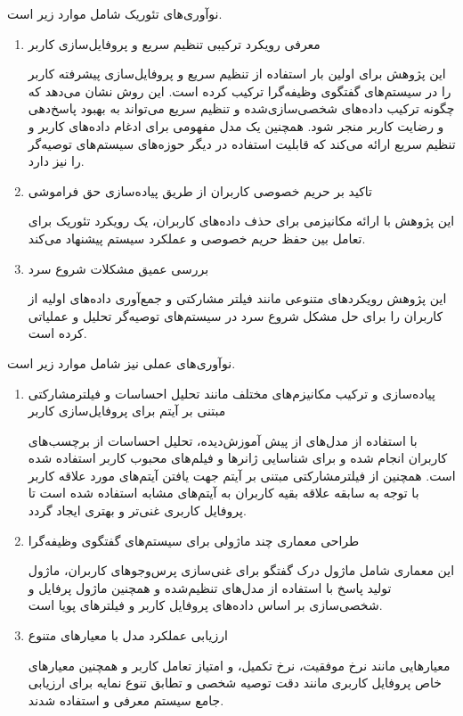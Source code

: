 نوآوری‌های تئوریک شامل موارد زیر است.
\begin{enumerate}
\item
معرفی رویکرد ترکیبی تنظیم سریع و پروفایل‌سازی کاربر

این پژوهش برای اولین بار استفاده از تنظیم سریع و پروفایل‌سازی پیشرفته کاربر را در سیستم‌های گفتگوی وظیفه‌گرا ترکیب کرده است. این روش نشان می‌دهد که چگونه ترکیب داده‌های شخصی‌سازی‌شده و تنظیم سریع می‌تواند به بهبود پاسخ‌دهی و رضایت کاربر منجر شود. همچنین یک مدل مفهومی برای ادغام داده‌های کاربر و تنظیم سریع ارائه می‌کند که قابلیت استفاده در دیگر حوزه‌های سیستم‌های توصیه‌گر را نیز دارد.
\item
تاکید بر حریم خصوصی کاربران از طریق پیاده‌سازی حق فراموشی

این پژوهش با ارائه مکانیزمی برای حذف داده‌های کاربران، یک رویکرد تئوریک برای تعامل بین حفظ حریم خصوصی و عملکرد سیستم پیشنهاد می‌کند.

\item
بررسی عمیق مشکلات شروع سرد

این پژوهش رویکردهای متنوعی مانند فیلتر مشارکتی و جمع‌آوری داده‌های اولیه از کاربران را برای حل مشکل شروع سرد در سیستم‌های توصیه‌گر تحلیل و عملیاتی کرده است.
\end{enumerate}



نوآوری‌های عملی نیز شامل موارد زیر است.
\begin{enumerate}
\item
پیاده‌سازی و ترکیب مکانیزم‌های مختلف مانند تحلیل احساسات و فیلترمشارکتی مبتنی بر آیتم برای پروفایل‌سازی کاربر

با استفاده از مدل‌های از پیش آموزش‌دیده، تحلیل احساسات از برچسب‌های کاربران انجام شده و برای شناسایی ژانرها و فیلم‌های محبوب کاربر استفاده شده است. همچنین از فیلترمشارکتی مبتنی بر آیتم جهت یافتن آیتم‌های مورد علاقه کاربر با توجه به سابقه علاقه بقیه کاربران به آیتم‌های مشابه استفاده شده است تا پروفایل کاربری غنی‌تر و بهتری ایجاد گردد.

\item
طراحی معماری چند ماژولی برای سیستم‌های گفتگوی وظیفه‌گرا

این معماری شامل ماژول درک گفتگو برای غنی‌سازی پرس‌وجوهای کاربران، ماژول تولید پاسخ با استفاده از مدل‌های تنظیم‌شده و همچنین ماژول پرفایل و شخصی‌سازی بر اساس داده‌های پروفایل کاربر و فیلترهای پویا است.

\item
ارزیابی عملکرد مدل با معیارهای متنوع

معیارهایی مانند نرخ موفقیت، نرخ تکمیل، و امتیاز تعامل کاربر و همچنین معیارهای خاص پروفایل کاربری مانند دقت توصیه شخصی و تطابق تنوع نمایه برای ارزیابی جامع سیستم معرفی و استفاده شدند.
\end{enumerate}



